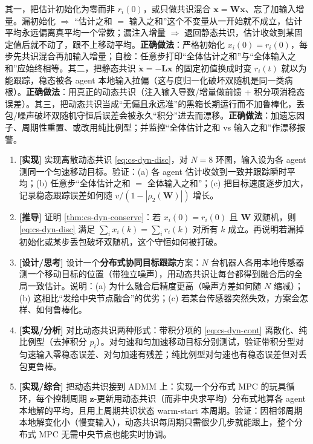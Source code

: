 \begin{pitfall}[陷阱：忘记初始化 $x_i(0)=r_i(0)$ 或漏注入增量；误以为静态共识喂时变输入能跟踪；忽视积分型漂移]
其一，把估计初始化为零而非 $r_i(0)$，或只做共识混合 $\mathbf{x}=\mathbf{W}\mathbf{x}$、忘了加输入增量。漏初始化 $\Rightarrow$ “估计之和 $=$ 输入之和”这个不变量从一开始就不成立，估计平均永远偏离真平均一个常数；漏注入增量 $\Rightarrow$ 退回静态共识，估计收敛到某固定值后就不动了，跟不上移动平均。\textbf{正确做法}：严格初始化 $x_i(0)=r_i(0)$，每步先共识混合再加输入增量；自检：任意步打印“全体估计之和”与“全体输入之和”应始终相等。其二，把静态共识 $\dot{\mathbf{x}}=-\mathbf{L}\mathbf{x}$ 的固定初值换成时变 $r_i(t)$ 就以为能跟踪，稳态被各 agent 本地输入拉偏（这与度归一化破坏双随机是同一类病根）。\textbf{正确做法}：用真正的动态共识（注入输入导数/增量做前馈 + 积分项消稳态误差）。其三，把动态共识当成“无偏且永远准”的黑箱长期运行而不加鲁棒化，丢包/噪声破坏双随机守恒后误差会被永久“积分”进去而漂移。\textbf{正确做法}：加遗忘因子、周期性重置、或改用纯比例型；并监控“全体估计之和 vs 输入之和”作漂移报警。
\end{pitfall}

\begin{practice}
\begin{enumerate}
  \item \textbf{[实现]} 实现离散动态共识 \cref{eq:cs-dyn-disc}，对 $N=8$ 环图，输入设为各 agent 测同一个匀速移动目标。验证：(a) 各 agent 估计收敛到一致并跟踪瞬时平均；(b) 任意步“全体估计之和 $=$ 全体输入之和”；(c) 把目标速度逐步加大，记录稳态跟踪误差如何随 $v/(1-|\rho_2(\mathbf{W})|)$ 增长。
  \item \textbf{[推导]} 证明 \cref{thm:cs-dyn-conserve}：若 $x_i(0)=r_i(0)$ 且 $\mathbf{W}$ 双随机，则 \cref{eq:cs-dyn-disc} 满足 $\sum_i x_i(k)=\sum_i r_i(k)$ 对所有 $k$ 成立。再说明若漏掉初始化或某步丢包破坏双随机，这个守恒如何被打破。
  \item \textbf{[设计/思考]} 设计一个\textbf{分布式协同目标跟踪}方案：$N$ 台机器人各用本地传感器测一个移动目标的位置（带独立噪声），用动态共识让每台都得到融合后的全局一致估计。说明：(a) 为什么融合后精度更高（噪声方差如何随 $N$ 缩减）；(b) 这相比“发给中央节点融合”的优劣；(c) 若某台传感器突然失效，方案会怎样、如何鲁棒化。
  \item \textbf{[实现/分析]} 对比动态共识两种形式：带积分项的 \cref{eq:cs-dyn-cont} 离散化、纯比例型（去掉积分 $p_i$）。对匀速和匀加速移动目标分别测试，验证带积分型对匀速输入零稳态误差、对匀加速有残差；纯比例型对匀速也有稳态误差但对丢包更鲁棒。
  \item \textbf{[实现/综合]} 把动态共识接到 ADMM 上：实现一个分布式 MPC 的玩具循环，每个控制周期 $\mathbf{z}$-更新用动态共识（而非中央求平均）分布式地算各 agent 本地解的平均，且用上周期共识状态 warm-start 本周期。验证：因相邻周期本地解变化小（慢变输入），动态共识每周期只需很少几步就能跟上，整个分布式 MPC 无需中央节点也能实时协调。
\end{enumerate}
\end{practice}

